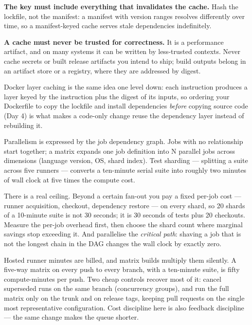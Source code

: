 \begin{wbitem}
  \item \textbf{The key must include everything that invalidates the cache.} Hash the lockfile, not the manifest: a manifest with version ranges resolves differently over time, so a manifest-keyed cache serves stale dependencies indefinitely.
  \item \textbf{A cache must never be trusted for correctness.} It is a performance artifact, and on many systems it can be written by less-trusted contexts. Never cache secrets or built release artifacts you intend to ship; build outputs belong in an artifact store or a registry, where they are addressed by digest.
\end{wbitem}

Docker layer caching is the same idea one level down: each instruction produces a layer keyed by the instruction plus the digest of its inputs, so ordering your Dockerfile to copy the lockfile and install dependencies \emph{before} copying source code (Day 4) is what makes a code-only change reuse the dependency layer instead of rebuilding it.

Parallelism is expressed by the job dependency graph. Jobs with no  relationship start together; a matrix expands one job definition into N parallel jobs across dimensions (language version, OS, shard index). Test sharding --- splitting a suite across five runners --- converts a ten-minute serial suite into roughly two minutes of wall clock at five times the compute cost.

\begin{perfnote}
There is a real ceiling. Beyond a certain fan-out you pay a fixed per-job cost --- runner acquisition, checkout, dependency restore --- on every shard, so 20 shards of a 10-minute suite is not 30 seconds; it is 30 seconds of tests plus 20 checkouts. Measure the per-job overhead first, then choose the shard count where marginal savings stop exceeding it. And parallelise the \emph{critical path}: shaving a job that is not the longest chain in the DAG changes the wall clock by exactly zero.
\end{perfnote}

\begin{costnote}
Hosted runner minutes are billed, and matrix builds multiply them silently. A five-way matrix on every push to every branch, with a ten-minute suite, is fifty compute-minutes per push. Two cheap controls recover most of it: cancel superseded runs on the same branch (concurrency groups), and run the full matrix only on the trunk and on release tags, keeping pull requests on the single most representative configuration. Cost discipline here is also feedback discipline --- the same change makes the queue shorter.
\end{costnote}

